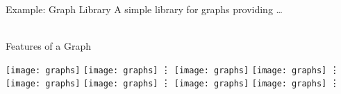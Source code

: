 \begin{frame}{Example: Graph Library}
	A simple library for graphs providing \ldots\\~\\
	\begin{mycolumns}[t]
	\mynextcolumn
	\end{mycolumns}
\end{frame}

\begin{frame}{Features of a Graph}
	\begin{mycolumns}[t,columns=4]
		\texttt{[image: graphs]}
		\texttt{[image: graphs]}
		\centering\Huge\vdots
	\mynextcolumn
		\texttt{[image: graphs]}
		\texttt{[image: graphs]}
		\centering\Huge\vdots
	\mynextcolumn
		\texttt{[image: graphs]}
		\texttt{[image: graphs]}
		\centering\Huge\vdots
	\mynextcolumn
		\texttt{[image: graphs]}
		\texttt{[image: graphs]}		
		\centering\Huge\vdots
	\end{mycolumns}
\end{frame}


